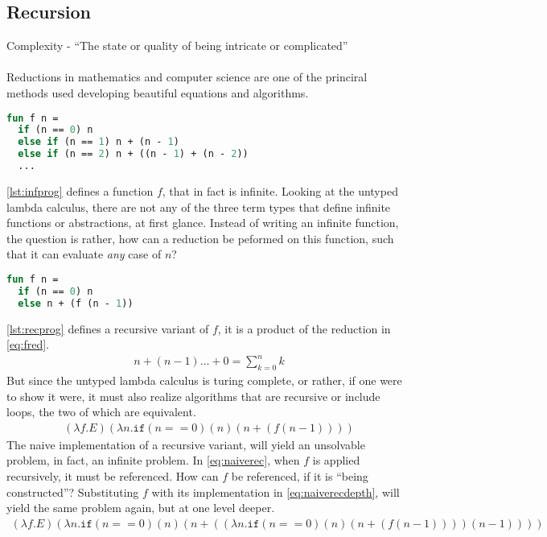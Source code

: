 \documentclass[11pt,oneside,a4paper]{report}
\begin{document}
\subsection{Recursion}
Complexity - ``The state or quality of being intricate or complicated''
\\\\
\noindent Reductions in mathematics and computer science are one of the princiral methods used developing beautiful equations and algorithms.
\begin{lstlisting}[language=ML,caption={Infinite program},label={lst:infprog},xleftmargin=.32\textwidth]
fun f n = 
  if (n == 0) n
  else if (n == 1) n + (n - 1)
  else if (n == 2) n + ((n - 1) + (n - 2))
  ...
\end{lstlisting}
\autoref{lst:infprog} defines a function $f$, that in fact is infinite.
Looking at the untyped lambda calculus, there are not any of the three term types that define infinite functions or abstractions, at first glance.
Instead of writing an infinite function, the question is rather, how can a reduction be peformed on this function, such that it can evaluate \textit{any} case of $n$?
\begin{lstlisting}[language=ML,caption={Recursive program},label={lst:recprog},xleftmargin=.32\textwidth]
fun f n = 
  if (n == 0) n
  else n + (f (n - 1))
\end{lstlisting}
\autoref{lst:recprog} defines a recursive variant of $f$, it is a product of the reduction in \autoref{eq:fred}.
\begin{align}
    n + (n - 1) \dots + 0 = \sum_{k = 0}^n k
    \label{eq:fred}
\end{align}
But since the untyped lambda calculus is turing complete, or rather, if one were to show it were,
it must also realize algorithms that are recursive or include loops, the two of which are equivalent.
\begin{align}
    (\lambda f . E) (\lambda n . \texttt{if} (n == 0) (n) (n + (f (n - 1))))
    \label{eq:naiverec}
\end{align}
The naive implementation of a recursive variant, will yield an unsolvable problem, in fact, an infinite problem.
In \autoref{eq:naiverec}, when $f$ is applied recursively, it must be referenced.
How can $f$ be referenced, if it is ``being constructed''?
Substituting $f$ with its implementation in \autoref{eq:naiverecdepth}, will yield the same problem again, but at one level deeper.
\begin{align}
    (\lambda f . E) (\lambda n . \texttt{if} (n == 0) (n) (n + ((\lambda n . \texttt{if} (n == 0) (n) (n + (f (n - 1)))) (n - 1))))
    \label{eq:naiverecdepth}
\end{align}
\end{document}

